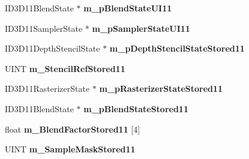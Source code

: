 \begin{DoxyCompactItemize}
\item 
\hypertarget{class_c_d_x_u_t_dialog_resource_manager_a88753072be4efc3662a4974e4cdca342}{I\+D3\+D11\+Blend\+State $\ast$ {\bfseries m\+\_\+p\+Blend\+State\+U\+I11}}\label{class_c_d_x_u_t_dialog_resource_manager_a88753072be4efc3662a4974e4cdca342}

\item 
\hypertarget{class_c_d_x_u_t_dialog_resource_manager_a0181a9b8a3344a0050c26d3029ac329a}{I\+D3\+D11\+Sampler\+State $\ast$ {\bfseries m\+\_\+p\+Sampler\+State\+U\+I11}}\label{class_c_d_x_u_t_dialog_resource_manager_a0181a9b8a3344a0050c26d3029ac329a}

\item 
\hypertarget{class_c_d_x_u_t_dialog_resource_manager_a0bf572ca3c166843bd582f5611d304a1}{I\+D3\+D11\+Depth\+Stencil\+State $\ast$ {\bfseries m\+\_\+p\+Depth\+Stencil\+State\+Stored11}}\label{class_c_d_x_u_t_dialog_resource_manager_a0bf572ca3c166843bd582f5611d304a1}

\item 
\hypertarget{class_c_d_x_u_t_dialog_resource_manager_afd2030098bfd2a6c1ad79488089e3fa2}{U\+I\+N\+T {\bfseries m\+\_\+\+Stencil\+Ref\+Stored11}}\label{class_c_d_x_u_t_dialog_resource_manager_afd2030098bfd2a6c1ad79488089e3fa2}

\item 
\hypertarget{class_c_d_x_u_t_dialog_resource_manager_af3faa9f368f4799dec6898f72a469f67}{I\+D3\+D11\+Rasterizer\+State $\ast$ {\bfseries m\+\_\+p\+Rasterizer\+State\+Stored11}}\label{class_c_d_x_u_t_dialog_resource_manager_af3faa9f368f4799dec6898f72a469f67}

\item 
\hypertarget{class_c_d_x_u_t_dialog_resource_manager_a9089da677e58bb5790153451e843654a}{I\+D3\+D11\+Blend\+State $\ast$ {\bfseries m\+\_\+p\+Blend\+State\+Stored11}}\label{class_c_d_x_u_t_dialog_resource_manager_a9089da677e58bb5790153451e843654a}

\item 
\hypertarget{class_c_d_x_u_t_dialog_resource_manager_a9eace610b7c16977687edc0edb05ce4b}{float {\bfseries m\+\_\+\+Blend\+Factor\+Stored11} \mbox{[}4\mbox{]}}\label{class_c_d_x_u_t_dialog_resource_manager_a9eace610b7c16977687edc0edb05ce4b}

\item 
\hypertarget{class_c_d_x_u_t_dialog_resource_manager_a9d0a7029cb06517c261b0e6ca78becec}{U\+I\+N\+T {\bfseries m\+\_\+\+Sample\+Mask\+Stored11}}\label{class_c_d_x_u_t_dialog_resource_manager_a9d0a7029cb06517c261b0e6ca78becec}


\end{DoxyCompactItemize}
